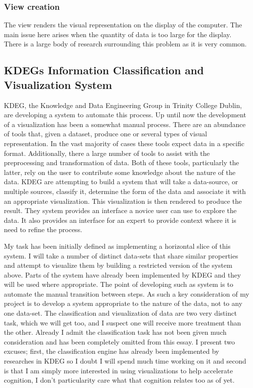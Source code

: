 \documentclass[a4paper, 10pt, titlepage]{article}
\begin{document}
\subsubsection{View creation}
The view renders the visual representation on the display of the computer. The main issue here arises when the quantity of data is too large for the display. There is a large body of research surrounding this problem as it is very common.

\subsection{KDEGs Information Classification and Visualization System}
KDEG, the Knowledge and Data Engineering Group in Trinity College Dublin, are developing a system to automate this process. Up until now the development of a visualization has been a somewhat manual process. There are an abundance of tools that, given a dataset, produce one or several types of visual representation. In the vast majority of cases these tools expect data in a specific format. Additionally, there a large number of tools to assist with the preprocessing and transformation of data. Both of these tools, particularly the latter, rely on the user to contribute some knowledge about the nature of the data. KDEG are attempting to build a system that will take a data-source, or multiple sources, classify it, determine the form of the data and associate it with an appropriate visualization. This visualization is then rendered to produce the result. They system provides an interface a novice user can use to explore the data. It also provides an interface for an expert to provide context where it is need to refine the process.

My task has been initially defined as implementing a horizontal slice of this system. I will take a number of distinct data-sets that share similar properties and attempt to visualize them by building a restricted version of the system above. Parts of the system have already been implemented by KDEG and they will be used where appropriate. The point of developing such as system is to automate the manual transition between steps. As such a key consideration of my project is to develop a system appropriate to the nature of the data, not to any one data-set. The classification and visualization of data are two very distinct task, which we will get too, and I suspect one will receive more treatment than the other. Already I admit the classification task has not been given much consideration and has been completely omitted from this essay. I present two excuses; first, the classification engine has already been implemented by researches in KDEG so I doubt I will spend much time working on it and second is that I am simply more interested in using visualizations to help accelerate cognition, I don't particularity care what that cognition relates too as of yet.
\end{document}
